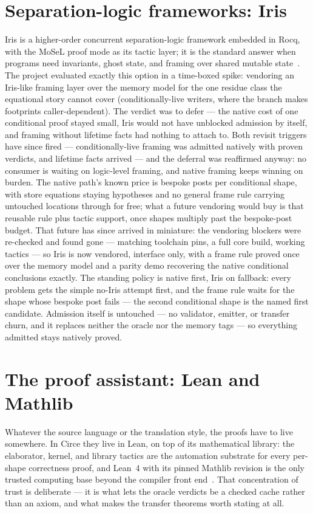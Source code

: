\section{Separation-logic frameworks: Iris}

Iris is a higher-order concurrent separation-logic framework embedded in
Rocq, with the MoSeL proof mode as its tactic layer; it is the standard
answer when programs need invariants, ghost state, and framing over
shared mutable state~\cite{iris}. The project evaluated exactly this
option in a time-boxed spike: vendoring an Iris-like framing layer over
the memory model for the one residue class the equational story cannot
cover (conditionally-live writers, where the branch makes footprints
caller-dependent). The verdict was to defer --- the native cost of one
conditional proof stayed small, Iris would not have unblocked admission
by itself, and framing without lifetime facts had nothing to attach to.
Both revisit triggers have since fired --- conditionally-live framing
was admitted natively with proven verdicts, and lifetime facts
arrived --- and the deferral was reaffirmed anyway: no consumer is
waiting on logic-level framing, and native framing keeps winning on
burden. The native path's known price is bespoke posts per conditional
shape, with store equations staying hypotheses and no general frame
rule carrying untouched locations through for free; what a future
vendoring would buy is that reusable rule plus tactic support, once
shapes multiply past the bespoke-post budget. That future has since
arrived in miniature: the vendoring blockers were re-checked and found
gone --- matching toolchain pins, a full core build, working tactics
--- so Iris is now vendored, interface only, with a frame rule proved
once over the memory model and a parity demo recovering the native
conditional conclusions exactly. The standing policy is native first,
Iris on fallback: every problem gets the simple no-Iris attempt first,
and the frame rule waits for the shape whose bespoke post fails ---
the second conditional shape is the named first candidate. Admission
itself is untouched --- no validator, emitter, or transfer churn, and
it replaces neither the oracle nor the memory tags --- so everything
admitted stays natively proved.

\section{The proof assistant: Lean and Mathlib}

Whatever the source language or the translation style, the proofs have
to live somewhere. In Circe they live in Lean, on top of its
mathematical library: the elaborator, kernel, and library tactics are
the automation substrate for every per-shape correctness proof, and
Lean~4 with its pinned Mathlib revision is the only trusted computing
base beyond the compiler front end~\cite{lean4,mathlib4}. That
concentration of trust is deliberate --- it is what lets the oracle
verdicts be a checked cache rather than an axiom, and what makes the
transfer theorems worth stating at all.
